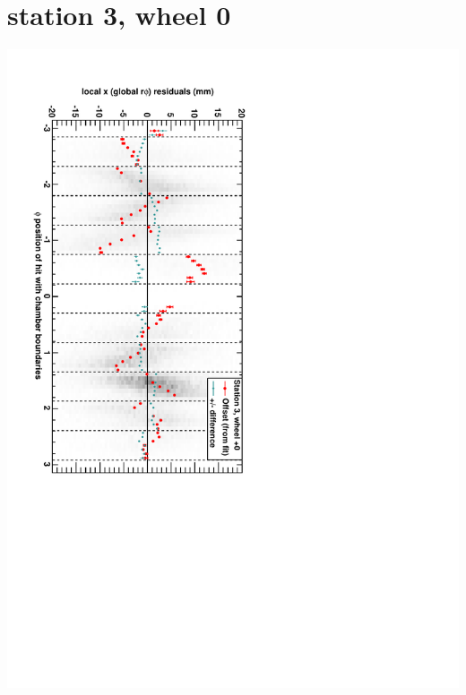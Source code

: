 \documentclass[compress]{beamer}
\begin{document}
\section*{station 3, wheel 0}
\begin{frame} \vfill \mbox{\hspace{-1 cm}\includegraphics[height=1.2\linewidth, angle=90]{DTrphiVsPhi_st3_whC.pdf}} \end{frame}
\end{document}
